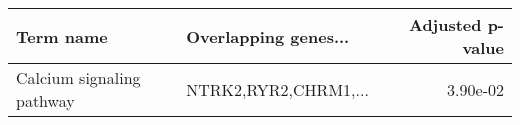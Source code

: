 \begin{tabular}{llr}
\toprule
                Term name & Overlapping genes... &  Adjusted p-value \\
\midrule
Calcium signaling pathway & NTRK2,RYR2,CHRM1,... &          3.90e-02 \\
\bottomrule
\end{tabular}
